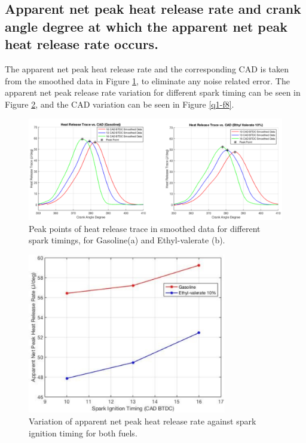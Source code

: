 \documentclass[11pt]{article}
\begin{document}
\subsection*{Apparent net peak heat release rate and crank angle degree at which the apparent net peak heat release rate occurs.}
The apparent net peak heat release rate and the corresponding CAD is taken from the smoothed data in Figure \ref{q1-f6}, to eliminate any noise related error. The apparent net peak release rate variation for different spark timing can be seen in Figure \ref{q1-f7}, and the CAD variation can be seen in Figure \ref{q1-f8}.
\begin{figure}[H]
    \centering
    \includegraphics[width = \textwidth]{./img/diagram13.png}
    \caption{Peak points of heat release trace in smoothed data for different spark timings, for Gasoline(a) and Ethyl-valerate (b).}
    \label{q1-f6}
\end{figure}
\begin{figure}[H]
    \centering
    \includegraphics[height = 7cm]{./img/diagram14.png}
    \caption{Variation of apparent net peak heat release rate against spark ignition timing for both fuels.}
    \label{q1-f7}
\end{figure}
\end{document}
